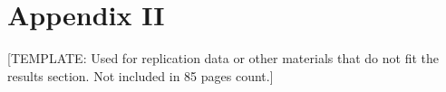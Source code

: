 \chapter*{Appendix II}

[TEMPLATE: Used for replication data or other materials that do not fit the results section. Not included in 85 pages count.]